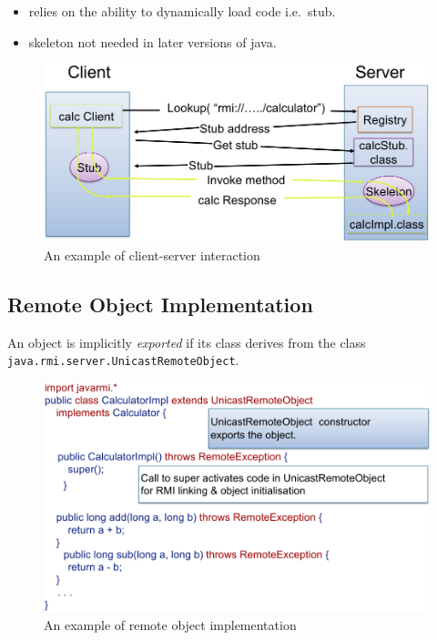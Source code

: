 \documentclass[twocolumn,landscape,10pt]{article}
\theoremstyle{definition}
\begin{document}
\begin{itemize}
    \item relies on the ability to dynamically load code i.e.\ stub.
    \item skeleton not needed in later versions of java.
\end{itemize} 

\begin{figure}[h]
  	\includegraphics[scale=0.30]{RMI_interaction.png}
  	\centering
    \caption{An example of client-server interaction}
\end{figure}

\subsection{Remote Object Implementation}

An object is implicitly \emph{exported} if its class derives from the class
\texttt{java.rmi.server.UnicastRemoteObject}.

\begin{figure}[!h]
  	\includegraphics[scale=0.30]{remote_obj.png}
  	\centering
    \caption{An example of remote object implementation}
\end{figure}
\end{document}
